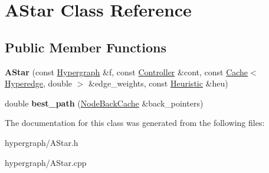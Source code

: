 \hypertarget{classAStar}{
\section{AStar Class Reference}
\label{classAStar}
}
\subsection*{Public Member Functions}
\begin{DoxyCompactItemize}
\item 
\hypertarget{classAStar_ab81d16160d530f11219ffab5247f01a7}{
{\bfseries AStar} (const \hyperlink{classScarab_1_1Hypergraph}{Hypergraph} \&f, const \hyperlink{classController}{Controller} \&cont, const \hyperlink{classCache}{Cache}$<$ \hyperlink{classScarab_1_1Hyperedge}{Hyperedge}, double $>$ \&edge\_\-weights, const \hyperlink{classHeuristic}{Heuristic} \&heu)}
\label{classAStar_ab81d16160d530f11219ffab5247f01a7}

\item 
\hypertarget{classAStar_abd1ceab9c3a450b581aded348cd7654e}{
double {\bfseries best\_\-path} (\hyperlink{classCache}{NodeBackCache} \&back\_\-pointers)}
\label{classAStar_abd1ceab9c3a450b581aded348cd7654e}

\end{DoxyCompactItemize}


The documentation for this class was generated from the following files:\begin{DoxyCompactItemize}
\item 
hypergraph/AStar.h\item 
hypergraph/AStar.cpp\end{DoxyCompactItemize}
